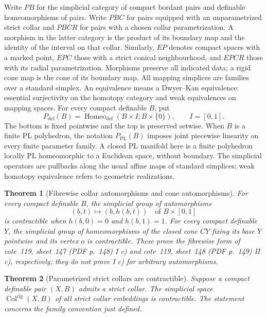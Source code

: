 \documentclass[11pt,a4paper]{article}
\newtheorem{theorem}{Theorem}[section]
\theoremstyle{definition}
\begin{document}
Write $PB$ for the simplicial category of compact bordant pairs and
definable homeomorphisms of pairs.  Write $PBC$ for pairs equipped with
an unparametrized strict collar and $PBCR$ for pairs with a chosen collar
parametrization.  A morphism in the latter category is the product of its
boundary map and the identity of the interval on that collar.  Similarly,
$EP$ denotes compact spaces with a marked point, $EPC$ those with a strict
conical neighbourhood, and $EPCR$ those with its radial parametrization.
Morphisms preserve all indicated data; a rigid cone map is the cone of
its boundary map.  All mapping simplices are families over a standard
simplex.  An equivalence means a Dwyer--Kan equivalence: essential
surjectivity on the homotopy category and weak equivalences on mapping
spaces.  For every compact definable $B$, put
\[
 P_{\mathrm{def}}(B)=\operatorname{Homeo}_{\mathrm{def}}
 (B\times I;B\times\{0\}),\qquad I=[0,1].
\]
The bottom is fixed pointwise and the top is preserved setwise.  When $B$ is a finite PL polyhedron, the notation $P_{\mathrm{PL}}(B)$
imposes joint piecewise linearity on every finite parameter family.
A closed PL manifold here is a finite polyhedron locally PL homeomorphic
to a Euclidean space, without boundary. The simplicial operators are
pullbacks along the usual affine maps of standard simplices; weak
homotopy equivalence refers to geometric realizations.

\begin{theorem}[Fibrewise collar automorphisms and cone automorphisms]\label{result-1}
For every compact definable $B$, the simplicial group of automorphisms
\[
 (b,t)\longmapsto(b,h(b,t))\quad\text{of }B\times[0,1]
\]
is contractible when $h(b,0)=0$ and $h(b,1)=1$. For every compact
definable $Y$, the simplicial group of homeomorphisms of the closed
cone $CY$ fixing its base $Y$ pointwise and its vertex $o$ is contractible.
These prove the fibrewise form of cote~119, sheet~147 (PDF p.~148) I c) and cote~119, sheet~148 (PDF p.~149) II c),
respectively; they do not prove I c) for arbitrary automorphisms.
\end{theorem}

\begin{theorem}[Parametrized strict collars are contractible]\label{result-2}
Suppose a compact definable pair $(X,B)$ admits a strict collar.
The simplicial space $\operatorname{Col}^{\mathrm{rig}}(X,B)$ of all
strict collar embeddings is contractible. The statement concerns the family convention just defined.
\end{theorem}
\end{document}
